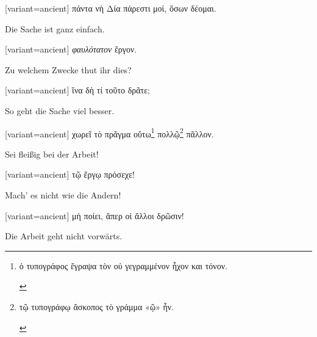 \switchcolumn

\begin{greek}[variant=ancient]%
πάντα νὴ Δία πάρεστι μοί, ὅσων δέομαι.

\end{greek}%
\switchcolumn*

Die Sache ist ganz einfach.

\switchcolumn

\begin{greek}[variant=ancient]%
\emph{φαυλότατον} ἔργον.

\end{greek}%
\switchcolumn*

Zu welchem Zwecke thut ihr dies?

\switchcolumn

\begin{greek}[variant=ancient]%
ἵνα δὴ τί τοῦτο δρᾶτε;

\end{greek}%
\switchcolumn*

So geht die Sache viel besser.

\switchcolumn

\begin{greek}[variant=ancient]%
χωρεῖ τὸ πρᾶγμα οὕτω\footnote{\begin{latin}%
\textgreek[variant=ancient]{ὁ τυπογράφος ἔγραψα τὸν οὐ γεγραμμένον
ἦχον και τόνον.}\end{latin}%
} πολλῷ\footnote{\begin{latin}%
\textgreek[variant=ancient]{τῷ τυπογράφῳ ἄσκοπος τὸ γράμμα «ῷ» ἦν.}\end{latin}%
} πᾶλλον.

\end{greek}%
\switchcolumn*

Sei fleißig bei der Arbeit!

\switchcolumn

\begin{greek}[variant=ancient]%
τῷ ἔργῳ πρόσεχε!

\end{greek}%
\switchcolumn*

Mach' es nicht wie die Andern!

\switchcolumn

\begin{greek}[variant=ancient]%
μὴ ποίει, ἅπερ οἱ ἄλλοι δρῶσιν!

\end{greek}%
\switchcolumn*

Die Arbeit geht nicht vorwärts.

